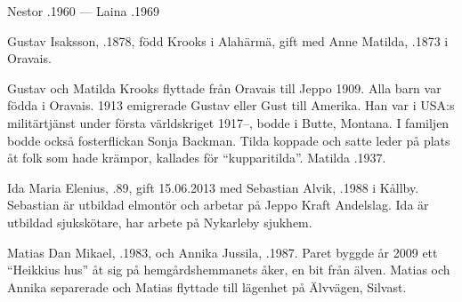 Nestor .1960  ---  Laina .1969




%
Gustav Isaksson, .1878, född Krooks i Alahärmä, gift med Anne Matilda, .1873 i Oravais.
\begin{jhchildren}
  \item {}
  \item {}
  \item {}
\end{jhchildren}
Gustav och Matilda Krooks flyttade från Oravais till Jeppo 1909. Alla barn var födda i Oravais. 1913 emigrerade Gustav eller Gust till Amerika. Han var i USA:s militärtjänst under första världskriget 1917--, bodde i Butte, Montana. I familjen bodde också fosterflickan Sonja Backman. Tilda koppade och satte leder på plats åt folk som hade krämpor, kallades för ``kupparitilda''. 	Matilda .1937.



%



%
Ida Maria Elenius, .89, gift 15.06.2013 med Sebastian Alvik, .1988 i Kållby. Sebastian är utbildad elmontör och arbetar på Jeppo Kraft Andelslag. Ida är utbildad sjukskötare, har arbete på Nykarleby sjukhem.
\begin{jhchildren}
  \item {}
  \item {}
\end{jhchildren}


%
Matias Dan Mikael, .1983, och Annika Jussila, .1987. Paret byggde år 2009 ett ``Heikkius hus'' åt sig på hemgårdshemmanets åker, en bit från älven. Matias och Annika separerade och Matias flyttade till lägenhet på Älvvägen, Silvast.
